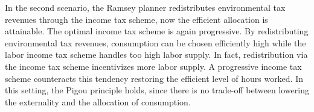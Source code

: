 %
In the second scenario, the Ramsey planner redistributes environmental tax revenues through the income tax scheme, now the efficient allocation is attainable. The optimal income tax scheme is again progressive. By redistributing environmental tax revenues, consumption can be chosen efficiently high while the labor income tax scheme handles too high labor supply. In fact, redistribution via the income tax scheme incentivizes more labor supply. A progressive income tax scheme counteracts this tendency restoring the efficient level of hours worked. 
In this setting, the Pigou principle holds, since there is no trade-off between lowering the externality and the allocation of consumption.
% 
% 
% 


